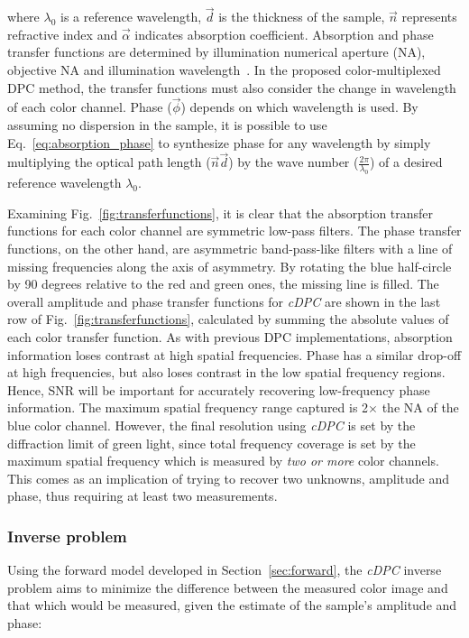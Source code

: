 \noindent where $\lambda_0$ is a reference wavelength, $\vec{d}$ is the thickness of the sample, $\vec{n}$ represents refractive index and $\vec{\alpha}$ indicates absorption coefficient. Absorption and phase transfer functions are determined by illumination numerical aperture (NA), objective NA and illumination wavelength~\cite{tian2015quantitative}. In the proposed color-multiplexed DPC method, the transfer functions must also consider the change in wavelength of each color channel. Phase ($\vec{\phi}$) depends on which wavelength is used. By assuming no dispersion in the sample, it is possible to use Eq.~\eqref{eq:absorption_phase} to synthesize phase for any wavelength by simply multiplying the optical path length ($\vec{n}\vec{d}$) by the wave number ($\frac{2\pi}{\lambda_0}$) of a desired reference wavelength $\lambda_0$.

Examining Fig.~\ref{fig:transferfunctions}, it is clear that the absorption transfer functions for each color channel are symmetric low-pass filters. The phase transfer functions, on the other hand, are asymmetric band-pass-like filters with a line of missing frequencies along the axis of asymmetry. By rotating the blue half-circle by 90 degrees relative to the red and green ones, the missing line is filled. The overall amplitude and phase transfer functions for \textit{cDPC} are shown in the last row of Fig.~\ref{fig:transferfunctions}, calculated by summing the absolute values of each color transfer function. As with previous DPC implementations, absorption information loses contrast at high spatial frequencies. Phase has a similar drop-off at high frequencies, but also loses contrast in the low spatial frequency regions. Hence, SNR will be important for accurately recovering low-frequency phase information. The maximum spatial frequency range captured is 2$\times$ the NA of the blue color channel. However, the final resolution using \textit{cDPC} is set by the diffraction limit of green light, since total frequency coverage is set by the maximum spatial frequency which is measured by \textit{two or more} color channels. This comes as an implication of trying to recover two unknowns, amplitude and phase, thus requiring at least two measurements.

\subsubsection{Inverse problem}
Using the forward model developed in Section~\ref{sec:forward}, the \textit{cDPC} inverse problem aims to minimize the difference between the measured color image and that which would be measured, given the estimate of the sample's amplitude and phase:

